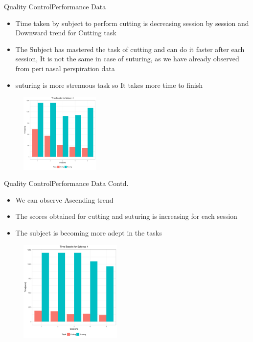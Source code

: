 \documentclass{beamer}
\begin{document}
 
\begin{frame}{Quality Control}{Performance Data }

  \begin{itemize}
  \item {
  Time taken by subject to perform cutting is decreasing session by session and Downward trend for Cutting task }
 \item {The Subject has mastered the task of cutting and can do it faster after each session, It is not the same in case of suturing, as we have already observed from peri nasal perspiration data }
 \item {suturing is more strenuous task so It takes more time to finish}
      \end{itemize}
    \begin{figure}
	\includegraphics[width=0.35\textwidth]{3_Time_barplot.pdf}
	\end{figure}
 \end{frame}
\begin{frame}{Quality Control}{Performance Data Contd.}
\begin{itemize}
  \item {
  We can observe Ascending trend }
  \item {The scores obtained for cutting and suturing is increasing for each session}
  \item {The subject is becoming more adept in the tasks }

      \end{itemize}
    \begin{figure}
	\includegraphics[width=0.45\textwidth]{4_Time_barplot.pdf}
	\end{figure}
 \end{frame}
\end{document}
